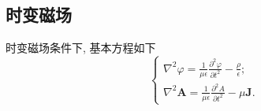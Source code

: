 \subsection{时变磁场}
时变磁场条件下, 基本方程如下
\begin{equation}
    \begin{cases}
        \nabla^2\varphi=\frac{1}{\mu\epsilon}\frac{\partial^2\varphi}{\partial t^2}-\frac{\rho}{\epsilon}; \\
        \nabla^2\bm{A}=\frac{1}{\mu\epsilon}\frac{\partial^2 A}{\partial t^2}-\mu\bm{J}.
    \end{cases}
\end{equation}
